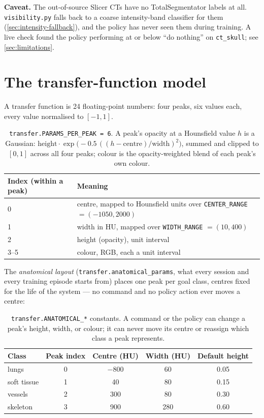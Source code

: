 \documentclass[10pt]{article}
\newcommand{\caveattext}[1]{\begin{findingbox}[colframe=black!30]\textbf{Caveat.} #1\end{findingbox}}
\newcommand{\code}[1]{\texttt{#1}}
\begin{document}
\caveattext{The out-of-source Slicer CTs have no TotalSegmentator labels at
all. \code{visibility.py} falls back to a coarse intensity-band classifier
for them (\cref{sec:intensity-fallback}), and the policy has never seen them
during training. A live check found the policy performing at or below ``do
nothing'' on \code{ct\_skull}; see \cref{sec:limitations}.}

\newpage
\section{The transfer-function model}
\label{sec:tf-model}

A transfer function is 24 floating-point numbers: four peaks, six values
each, every value normalised to $[-1, 1]$.

\begin{table}[h]
\centering\small
\begin{tabular}{@{}ll@{}}
\toprule
\textbf{Index (within a peak)} & \textbf{Meaning} \\
\midrule
0 & centre, mapped to Hounsfield units over \code{CENTER\_RANGE} $= (-1050, 2000)$ \\
1 & width in HU, mapped over \code{WIDTH\_RANGE} $= (10, 400)$ \\
2 & height (opacity), unit interval \\
3--5 & colour, RGB, each a unit interval \\
\bottomrule
\end{tabular}
\caption{\code{transfer.PARAMS\_PER\_PEAK = 6}. A peak's opacity at a
Hounsfield value $h$ is a Gaussian: $\text{height} \cdot
\exp\!\big(-0.5\,((h-\text{centre})/\text{width})^2\big)$, summed and clipped
to $[0,1]$ across all four peaks; colour is the opacity-weighted blend of
each peak's own colour.}
\end{table}

The \emph{anatomical layout} (\code{transfer.anatomical\_params}, what every
session and every training episode starts from) places one peak per goal
class, centres fixed for the life of the system --- no command and no policy
action ever moves a centre:

\begin{table}[h]
\centering\small
\begin{tabular}{@{}lcccc@{}}
\toprule
\textbf{Class} & \textbf{Peak index} & \textbf{Centre (HU)} & \textbf{Width (HU)} & \textbf{Default height} \\
\midrule
lungs & 0 & $-800$ & 60 & 0.05 \\
soft tissue & 1 & 40 & 80 & 0.15 \\
vessels & 2 & 300 & 80 & 0.30 \\
skeleton & 3 & 900 & 280 & 0.60 \\
\bottomrule
\end{tabular}
\caption{\code{transfer.ANATOMICAL\_*} constants. A command or the policy can
change a peak's height, width, or colour; it can never move its centre or
reassign which class a peak represents.}
\label{tab:anatomical}
\end{table}
\end{document}
